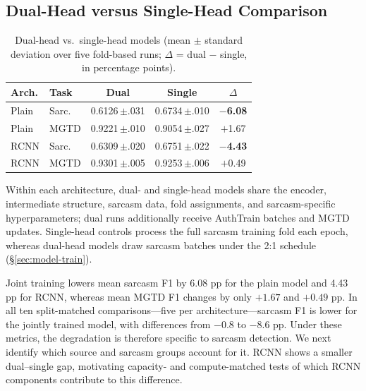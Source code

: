 \documentclass[11pt]{article}
\newcommand{\Sref}[1]{\hyperref[#1]{\S\ref*{#1}}}
\begin{document}
\subsection{Dual-Head versus Single-Head Comparison}
\label{sec:ablation}

\begin{table}[t]
  \centering
  \footnotesize
  \setlength{\tabcolsep}{2pt}
  \begin{tabular}{@{}llccc@{}}
    \toprule
    \textbf{Arch.} & \textbf{Task} & \textbf{Dual} & \textbf{Single} & \textbf{$\Delta$} \\
    \midrule
    Plain & Sarc. & 0.6126\,{\scriptsize$\pm$.031} & 0.6734\,{\scriptsize$\pm$.010} & \textbf{$-$6.08} \\
    Plain & MGTD & 0.9221\,{\scriptsize$\pm$.010} & 0.9054\,{\scriptsize$\pm$.027} & $+$1.67 \\
    RCNN  & Sarc. & 0.6309\,{\scriptsize$\pm$.020} & 0.6751\,{\scriptsize$\pm$.022} & \textbf{$-$4.43} \\
    RCNN  & MGTD & 0.9301\,{\scriptsize$\pm$.005} & 0.9253\,{\scriptsize$\pm$.006} & $+$0.49 \\
    \bottomrule
  \end{tabular}
  \caption{Dual-head vs.\ single-head models (mean $\pm$ standard deviation over five fold-based runs; $\Delta$ = dual $-$ single, in percentage points).}
  \label{tab:ablation}
\end{table}

Within each architecture, dual- and single-head models share the encoder, intermediate structure, sarcasm data, fold assignments, and sarcasm-specific hyperparameters; dual runs additionally receive AuthTrain batches and MGTD updates. Single-head controls process the full sarcasm training fold each epoch, whereas dual-head models draw sarcasm batches under the 2:1 schedule (\Sref{sec:model-train}).

Joint training lowers mean sarcasm F1 by 6.08 pp for the plain model and 4.43 pp for RCNN, whereas mean MGTD F1 changes by only $+1.67$ and $+0.49$ pp. In all ten split-matched comparisons---five per architecture---sarcasm F1 is lower for the jointly trained model, with differences from $-0.8$ to $-8.6$ pp. Under these metrics, the degradation is therefore specific to sarcasm detection. We next identify which source and sarcasm groups account for it. RCNN shows a smaller dual--single gap, motivating capacity- and compute-matched tests of which RCNN components contribute to this difference.
\end{document}
